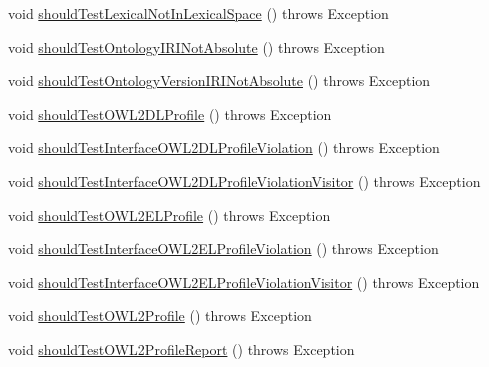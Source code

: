 \begin{DoxyCompactItemize}
\item 
void \hyperlink{classorg_1_1semanticweb_1_1owlapi_1_1contract_1_1_contract_owlapi_profiles_test_a2602ff3899d407272a82ec77b736832d}{should\-Test\-Lexical\-Not\-In\-Lexical\-Space} ()  throws Exception 
\item 
void \hyperlink{classorg_1_1semanticweb_1_1owlapi_1_1contract_1_1_contract_owlapi_profiles_test_a7bf16e180be845cdf87bbed103644dc8}{should\-Test\-Ontology\-I\-R\-I\-Not\-Absolute} ()  throws Exception 
\item 
void \hyperlink{classorg_1_1semanticweb_1_1owlapi_1_1contract_1_1_contract_owlapi_profiles_test_a4f3716028666fcd6ac261bdd65115326}{should\-Test\-Ontology\-Version\-I\-R\-I\-Not\-Absolute} ()  throws Exception 
\item 
void \hyperlink{classorg_1_1semanticweb_1_1owlapi_1_1contract_1_1_contract_owlapi_profiles_test_a4bd7bd94a5a63edba8896a8767e98d68}{should\-Test\-O\-W\-L2\-D\-L\-Profile} ()  throws Exception 
\item 
void \hyperlink{classorg_1_1semanticweb_1_1owlapi_1_1contract_1_1_contract_owlapi_profiles_test_a29bebefeb3f750b95193a0f43c619744}{should\-Test\-Interface\-O\-W\-L2\-D\-L\-Profile\-Violation} ()  throws Exception 
\item 
void \hyperlink{classorg_1_1semanticweb_1_1owlapi_1_1contract_1_1_contract_owlapi_profiles_test_aba2949c8d62f2ad8663571ebd939882a}{should\-Test\-Interface\-O\-W\-L2\-D\-L\-Profile\-Violation\-Visitor} ()  throws Exception 
\item 
void \hyperlink{classorg_1_1semanticweb_1_1owlapi_1_1contract_1_1_contract_owlapi_profiles_test_a44f681518633e1d7488f0798b7131bac}{should\-Test\-O\-W\-L2\-E\-L\-Profile} ()  throws Exception 
\item 
void \hyperlink{classorg_1_1semanticweb_1_1owlapi_1_1contract_1_1_contract_owlapi_profiles_test_a891203c6d79b5e4b11982d7abc7a5d61}{should\-Test\-Interface\-O\-W\-L2\-E\-L\-Profile\-Violation} ()  throws Exception 
\item 
void \hyperlink{classorg_1_1semanticweb_1_1owlapi_1_1contract_1_1_contract_owlapi_profiles_test_a67f1789484d1139218a3a8a5b0b2f444}{should\-Test\-Interface\-O\-W\-L2\-E\-L\-Profile\-Violation\-Visitor} ()  throws Exception 
\item 
void \hyperlink{classorg_1_1semanticweb_1_1owlapi_1_1contract_1_1_contract_owlapi_profiles_test_a116551c8859b350d941a5f2f5ce06741}{should\-Test\-O\-W\-L2\-Profile} ()  throws Exception 
\item 
void \hyperlink{classorg_1_1semanticweb_1_1owlapi_1_1contract_1_1_contract_owlapi_profiles_test_a624d7e3a8af940faffa8e237436e7388}{should\-Test\-O\-W\-L2\-Profile\-Report} ()  throws Exception 

\end{DoxyCompactItemize}
